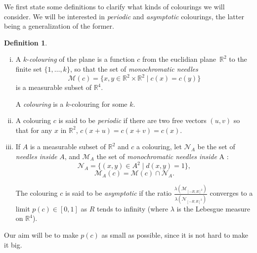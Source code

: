 \documentclass[a4paper,11pt]{article}
\theoremstyle{definition}
\newtheorem{definition}{Definition}
\theoremstyle{remark}
\newcommand{\R}{\mathbb{R}}
\newcommand{\M}{\mathcal{M}}
\newcommand{\N}{\mathcal{N}}
\begin{document}
We first state some definitions to clarify what kinds of colourings we will consider.
We will be interested in \textit{periodic} and \textit{asymptotic} colourings,
the latter being a generalization of the former.
\begin{definition}
\
\begin{enumerate}[i)] 
\item A $k$-\textit{colouring} of the plane is a function $c$ from the euclidian 
plane~$\R ^2$ to the finite set $\{1, \dots , k \}$, so that the set of
\textit{monochromatic needles}
\[ \M (c) = \{x,y \in \R ^2 \times \R ^2 \mid c(x) = c(y) \} \]
is a measurable subset of $\R ^4$.

A \textit{colouring} is a $k$-colouring for some $k$.
\item A colouring $c$ is said to be \textit{periodic} if there are two free
vectors $(u,v)$ so that for any $x$ in $\R ^2$, $c(x+u)=c(x+v)=c(x)$.
\item If $A$ is a measurable subset of $\R^2$ and $c$ a colouring, let $\N_A$ be
the set of \textit{needles inside} $A$, and $\M_A$ the set of \textit{monochromatic
needles inside} A :
\[\N_A = \{(x,y) \in A ^2 \mid d(x,y)=1\}, \]
\[\M_A (c) = \M (c) \cap \N_A. \]

The colouring $c$ is said to be \textit{asymptotic} if the ratio
$\frac{\lambda (\M_{[-R;R]^2})}{\lambda (\N_{[-R;R]^2})}$ 
converges to a limit $p(c) \in [0,1]$ as $R$ tends to infinity (where $\lambda$ 
is the Lebesgue measure on $\mathbb{R}^4$).
\end{enumerate}
\end{definition}

Our aim will be to make $p(c)$ as small as possible, since it is not hard
to make it big.
\\
\end{document}
